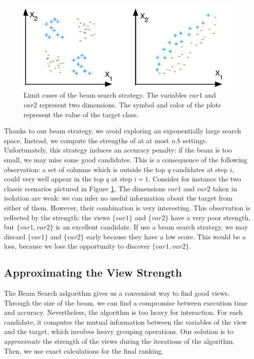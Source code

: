 \begin{figure}[t!]
\centering
\includegraphics[width=0.8\columnwidth]{images/strength-jump}
\caption{Limit cases of the beam search strategy. The variables $var1$ and
$var2$ represent two dimensions. The symbol and color of the plots represent
the value of the target class. }
\label{pic:strength-jump}
\end{figure}
Thanks to our beam strategy, we avoid exploring an exponentially large search
space. Instead, we compute the strengths of at at most $n.b$ settings.
Unfortunately, this strategy induces an accuracy penalty: if the beam is too
small, we may miss some good candidates. This is a consequence of the following
observation: a set of columns which is outside the top $q$ candidates at step
$i$, could very well appear in the top $q$ at step $i+1$. Consider for instance
the two classic scenarios pictured in Figure \ref{pic:strength-jump}. The
dimensions $var1$ and $var2$ taken in isolation are weak: we can infer no
useful information about the target from either of them. However, their
combination is very interesting.  This observation is reflected by the
strength: the views $\{var1\}$ and $\{var2\}$ have a very poor strength, but
$\{var1, var2\}$ is an excellent candidate. If use a beam search strategy, we
may discard  $\{var1\}$ and $\{var2\}$ early because they have a low score.
This would be a loss, because we lose the opportunity to discover $\{var1,
var2\}$.

\subsection{Approximating the View Strength}

The Beam Search aslgorithm gives us a convenient way to find good views.
Through the size of the beam, we can find a compromise between execution time
and accuracy.  Nevertheless, the algorithm is too heavy for interaction. For
each candidate, it computes the mutual information between the variables of the
view and the target, which involves heavy grouping operations. Our solution is
to \emph{approximate} the strength of the views during the iterations of the
algorithm. Then, we use exact calculations for the final ranking.

